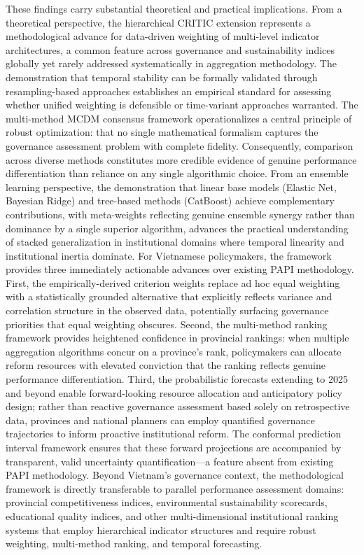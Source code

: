 \documentclass[12pt,a4paper]{article}
\begin{document}
These findings carry substantial theoretical and practical implications. From a theoretical perspective, the hierarchical CRITIC extension represents a methodological advance for data-driven weighting of multi-level indicator architectures, a common feature across governance and sustainability indices globally yet rarely addressed systematically in aggregation methodology. The demonstration that temporal stability can be formally validated through resampling-based approaches establishes an empirical standard for assessing whether unified weighting is defensible or time-variant approaches warranted. The multi-method MCDM consensus framework operationalizes a central principle of robust optimization: that no single mathematical formalism captures the governance assessment problem with complete fidelity. Consequently, comparison across diverse methods constitutes more credible evidence of genuine performance differentiation than reliance on any single algorithmic choice. From an ensemble learning perspective, the demonstration that linear base models (Elastic Net, Bayesian Ridge) and tree-based methods (CatBoost) achieve complementary contributions, with meta-weights reflecting genuine ensemble synergy rather than dominance by a single superior algorithm, advances the practical understanding of stacked generalization in institutional domains where temporal linearity and institutional inertia dominate. For Vietnamese policymakers, the framework provides three immediately actionable advances over existing PAPI methodology. First, the empirically-derived criterion weights replace ad hoc equal weighting with a statistically grounded alternative that explicitly reflects variance and correlation structure in the observed data, potentially surfacing governance priorities that equal weighting obscures. Second, the multi-method ranking framework provides heightened confidence in provincial rankings: when multiple aggregation algorithms concur on a province's rank, policymakers can allocate reform resources with elevated conviction that the ranking reflects genuine performance differentiation. Third, the probabilistic forecasts extending to 2025 and beyond enable forward-looking resource allocation and anticipatory policy design; rather than reactive governance assessment based solely on retrospective data, provinces and national planners can employ quantified governance trajectories to inform proactive institutional reform. The conformal prediction interval framework ensures that these forward projections are accompanied by transparent, valid uncertainty quantification---a feature absent from existing PAPI methodology. Beyond Vietnam's governance context, the methodological framework is directly transferable to parallel performance assessment domains: provincial competitiveness indices, environmental sustainability scorecards, educational quality indices, and other multi-dimensional institutional ranking systems that employ hierarchical indicator structures and require robust weighting, multi-method ranking, and temporal forecasting.
\end{document}
